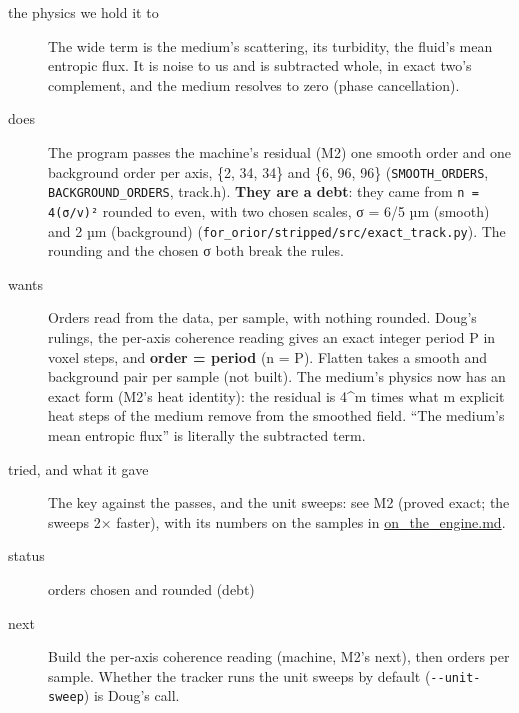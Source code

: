 \begin{description}
\item[{the physics we hold it to}] The wide term is the medium's scattering, its turbidity, the fluid's mean entropic flux. It is noise to us and is subtracted whole, in exact two's complement, and the medium resolves to zero (phase cancellation).
\item[{does}] The program passes the machine's residual (M2) one smooth order and one background order per axis, \{2, 34, 34\} and \{6, 96, 96\} (\texttt{SMOOTH\_\allowbreak{}ORDERS}, \texttt{BACKGROUND\_\allowbreak{}ORDERS}, track.h). \textbf{They are a debt}: they came from \texttt{n = 4(σ/\allowbreak{}v)²} rounded to even, with two chosen scales, σ = 6/5 µm (smooth) and 2 µm (background) (\texttt{for\_\allowbreak{}orior/\allowbreak{}stripped/\allowbreak{}src/\allowbreak{}exact\_\allowbreak{}track.\allowbreak{}py}). The rounding and the chosen σ both break the rules.
\item[{wants}] Orders read from the data, per sample, with nothing rounded. Doug's rulings, the per-axis coherence reading gives an exact integer period P in voxel steps, and \textbf{order = period} (n = P). Flatten takes a smooth and background pair per sample (not built). The medium's physics now has an exact form (M2's heat identity): the residual is 4\textasciicircum{}m times what m explicit heat steps of the medium remove from the smoothed field. “The medium's mean entropic flux” is literally the subtracted term.
\item[{tried, and what it gave}] The key against the passes, and the unit sweeps: see M2 (proved exact; the sweeps 2× faster), with its numbers on the samples in \hyperref[chap:on-the-engine]{on\_\allowbreak{}the\_\allowbreak{}engine.md}.
\item[{status}] orders chosen and rounded (debt)
\item[{next}] Build the per-axis coherence reading (machine, M2's next), then orders per sample. Whether the tracker runs the unit sweeps by default (\texttt{-\allowbreak{}-\allowbreak{}unit-\allowbreak{}sweep}) is Doug's call.
\end{description}

